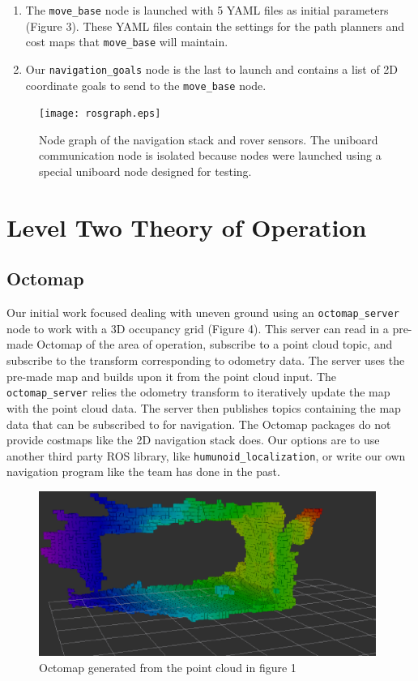 \documentclass[10pt, oneside,onecolumn]{IEEEtran}
\begin{document}
\begin{titlepage}
\begin{enumerate}
\item The \texttt{move\_base} node is launched with 5 YAML files as initial parameters (Figure 3). These YAML files contain the settings for the path planners and cost maps that \texttt{move\_base} will maintain. 

\item Our \texttt{navigation\_goals} node is the last to launch and contains a list of 2D coordinate goals to send to the \texttt{move\_base} node. 
\end{enumerate}

\begin{figure}
\centering
\texttt{[image: rosgraph.eps]}
\caption{Node graph of the navigation stack and rover sensors. The uniboard communication node is isolated because nodes were launched using a special uniboard node designed for testing.}
\end{figure}

\section{Level Two Theory of Operation}
\subsection{Octomap}
Our initial work focused dealing with uneven ground using an \texttt{octomap\_server} node to work with a 3D occupancy grid (Figure 4). This server can read in a pre-made Octomap of the area of operation, subscribe to a point cloud topic, and subscribe to the transform corresponding to odometry data. The server uses the pre-made map and builds upon it from the point cloud input. The \texttt{octomap\_server} relies the odometry transform to iteratively update the map with the point cloud data. The server then publishes topics containing the map data that can be subscribed to for navigation. The Octomap packages do not provide costmaps like the 2D navigation stack does. Our options are to use another third party ROS library, like \texttt{humunoid\_localization}, or write our own navigation program like the team has done in the past. 

\begin{figure}[H]
\centering
\includegraphics[width=110mm]{newoctomap.eps}
\caption{Octomap generated from the point cloud in figure 1\label{overflow}}
\end{figure}


\end{titlepage}
\end{document}
